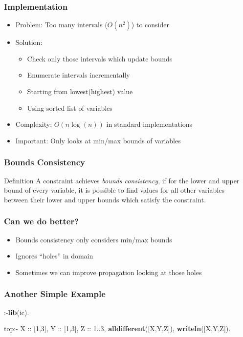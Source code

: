 \documentclass{beamer}
\begin{document}
\begin{frame}
\frametitle{Implementation}
\begin{itemize}
\item Problem: Too many intervals ($O(n^2)$) to consider
\item Solution:
\begin{itemize}
\item Check only those intervals which update bounds
\item Enumerate intervals incrementally
\item Starting from lowest(highest) value
\item Using sorted list of variables
\end{itemize}
\item Complexity: $O(n\log(n))$ in standard implementations
\item Important: Only looks at min/max bounds of variables
\end{itemize}
\end{frame}

\begin{frame}
\frametitle{Bounds Consistency}
\begin{block}{Definition}
A constraint achieves {\em bounds consistency}, if for the lower and upper bound of every variable, it is possible to find values for all other variables between their lower and upper bounds which satisfy the constraint.
\end{block}
\end{frame}

\begin{frame}
\frametitle{Can we do better?}
\begin{itemize}
\item Bounds consistency only considers min/max bounds
\item Ignores ``holes'' in domain
\item Sometimes we can improve propagation looking at those holes
\end{itemize}
\end{frame}

\begin{frame}[fragile]
\frametitle{Another Simple Example}
\begin{semiverbatim}
:-{\bf{}lib}(ic).

top:-
    X :: [1,3],
    Y :: [1,3],
    Z :: 1..3,
    {\bf{}alldifferent}([X,Y,Z]),
    {\bf{}writeln}([X,Y,Z]).
\end{semiverbatim}
\end{frame}
\end{document}
